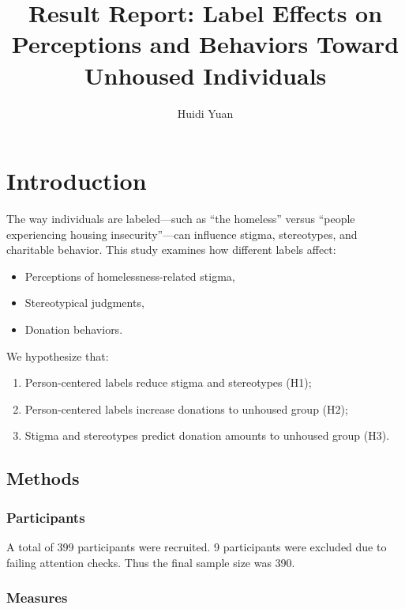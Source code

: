 \documentclass[
  man,
  floatsintext,
  longtable,
  nolmodern,
  notxfonts,
  notimes,
  colorlinks=true,linkcolor=blue,citecolor=blue,urlcolor=blue]{apa7}
\title{Result Report: Label Effects on Perceptions and Behaviors Toward
Unhoused Individuals}
\author{Huidi Yuan}
\affiliation{
{University of Chicago}}
\providecommand{\tightlist}{%
  \setlength{\itemsep}{0pt}\setlength{\parskip}{0pt}}
\begin{document}
\maketitle


\setcounter{secnumdepth}{-\maxdimen} %

\setlength\LTleft{0pt}


\section{Introduction}\label{introduction}

The way individuals are labeled---such as ``the homeless'' versus
``people experiencing housing insecurity''---can influence stigma,
stereotypes, and charitable behavior. This study examines how different
labels affect:

\begin{itemize}
\tightlist
\item
  Perceptions of homelessness-related stigma,
\item
  Stereotypical judgments,
\item
  Donation behaviors.
\end{itemize}

We hypothesize that:

\begin{enumerate}
\def\labelenumi{\arabic{enumi}.}
\tightlist
\item
  Person-centered labels reduce stigma and stereotypes (H1);
\item
  Person-centered labels increase donations to unhoused group (H2);
\item
  Stigma and stereotypes predict donation amounts to unhoused group
  (H3).
\end{enumerate}

\subsection{Methods}\label{methods}

\subsubsection{Participants}\label{participants}

A total of 399 participants were recruited. 9 participants were excluded
due to failing attention checks. Thus the final sample size was 390.

\subsubsection{Measures}\label{measures}
\end{document}

